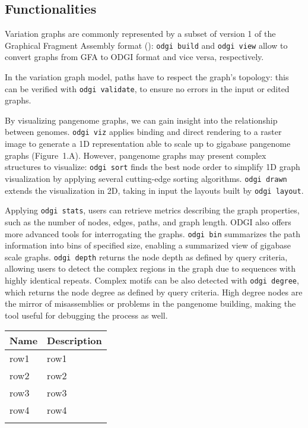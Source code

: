 \documentclass{bioinfo}
\begin{document}
    \subsection{Functionalities}

    Variation graphs are commonly represented by a subset of version 1 of the Graphical Fragment Assembly format
    (\citep{GFAv1}): \texttt{odgi build} and \texttt{odgi view} allow to convert graphs from GFA to ODGI format and
    vice versa, respectively.

    In the variation graph model, paths have to respect the graph’s topology: this can be verified with
    \texttt{odgi validate}, to ensure no errors in the input or edited graphs.

    By visualizing pangenome graphs, we can gain insight into the relationship between genomes. \texttt{odgi viz}
    applies binding and direct rendering to a raster image to generate a 1D representation able to scale up to gigabase
    pangenome graphs (Figure~1.A\vphantom{\ref{fig:01}}). However, pangenome graphs may present complex structures to
    visualize: \texttt{odgi sort} finds the best node order to simplify 1D graph visualization by applying several
    cutting-edge sorting algorithms. \texttt{odgi drawn} extends the visualization in 2D, taking in input the layouts
    built by \texttt{odgi layout}.

    Applying \texttt{odgi stats}, users can retrieve metrics describing the graph properties, such as the number of
    nodes, edges, paths, and graph length. ODGI also offers more advanced tools for interrogating the graphs.
    \texttt{odgi bin} summarizes the path information into bins of specified size, enabling a summarized view of
    gigabase scale graphs. \texttt{odgi depth} returns the node depth as defined by query criteria, allowing users to
    detect the complex regions in the graph due to sequences with highly identical repeats. Complex motifs can be also
    detected with \texttt{odgi degree}, which returns the node degree as defined by query criteria. High degree nodes
    are the mirror of misassemblies or problems in the pangenome building, making the tool useful for debugging the
    process as well.

    \begin{table}[!t]
         {
            \begin{tabular}{@{}ll@{}}
                \toprule Name & Description \\
                \midrule
                row1          & row1        \\
                row2          & row2        \\
                row3          & row3        \\
                row4          & row4        \\
                \botrule
            \end{tabular}}

    \end{table}
\end{document}
